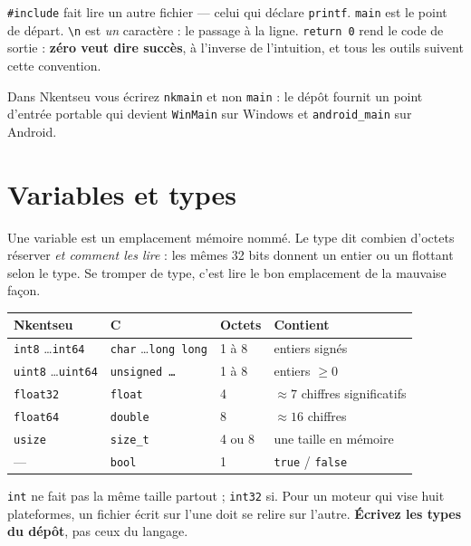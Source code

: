 \texttt{\#include} fait lire un autre fichier --- celui qui déclare
\texttt{printf}. \texttt{main} est le point de départ.
\texttt{\textbackslash n} est \emph{un} caractère : le passage à la ligne.
\texttt{return 0} rend le code de sortie : \textbf{zéro veut dire succès}, à
l'inverse de l'intuition, et tous les outils suivent cette convention.

Dans Nkentseu vous écrirez \texttt{nkmain} et non \texttt{main} : le dépôt
fournit un point d'entrée portable qui devient \texttt{WinMain} sur Windows et
\texttt{android\_main} sur Android.

\section{Variables et types}

Une variable est un emplacement mémoire nommé. Le type dit combien d'octets
réserver \emph{et comment les lire} : les mêmes 32 bits donnent un entier ou un
flottant selon le type. Se tromper de type, c'est lire le bon emplacement de la
mauvaise façon.

\begin{center}
\begin{tabular}{@{}llll@{}}
\toprule
\textbf{Nkentseu} & \textbf{C} & \textbf{Octets} & \textbf{Contient} \\
\midrule
\texttt{int8} \dots \texttt{int64}   & \texttt{char} \dots \texttt{long long} & 1 à 8 & entiers signés \\
\texttt{uint8} \dots \texttt{uint64} & \texttt{unsigned \dots} & 1 à 8 & entiers $\geq 0$ \\
\texttt{float32} & \texttt{float}  & 4 & $\approx 7$ chiffres significatifs \\
\texttt{float64} & \texttt{double} & 8 & $\approx 16$ chiffres \\
\texttt{usize}   & \texttt{size\_t} & 4 ou 8 & une taille en mémoire \\
--- & \texttt{bool} & 1 & \texttt{true} / \texttt{false} \\
\bottomrule
\end{tabular}
\end{center}

\begin{nkretenir}
\texttt{int} ne fait pas la même taille partout ; \texttt{int32} si. Pour un
moteur qui vise huit plateformes, un fichier écrit sur l'une doit se relire sur
l'autre. \textbf{Écrivez les types du dépôt}, pas ceux du langage.
\end{nkretenir}

